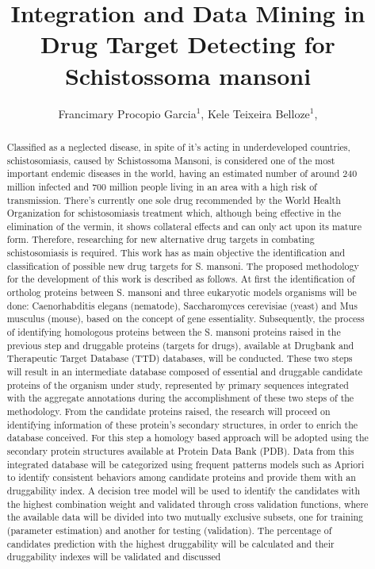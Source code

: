 \documentclass[twoside]{article}
\title{\vspace{-15mm}\fontsize{24pt}{10pt}\selectfont\textbf{ Integration and Data Mining in Drug Target Detecting for Schistossoma mansoni }} %
\author{ Francimary Procopio Garcia$^{1}$, Kele Teixeira Belloze$^{1}$, }
\affil{ 1 CEFET/RJ

 }
\date{}
\begin{document}
  
  
  \maketitle %
  
  
  \thispagestyle{fancy} %
  
  
  \begin{abstract}
  Classified as a neglected disease, in spite of it’s acting in underdeveloped countries, schistosomiasis, caused by Schistossoma Mansoni, is considered one of the most important endemic diseases in the world, having an estimated number of around 240 million infected and 700 million people living in an area with a high risk of transmission. There’s currently one sole drug recommended by the World Health Organization for schistosomiasis treatment which, although being effective in the elimination of the vermin, it shows collateral effects and can only act upon its mature form. Therefore, researching for new alternative drug targets in combating schistosomiasis is required. This work has as main objective the identification and classification of possible new drug targets for S. mansoni. The proposed methodology for the development of this work is described as follows.  At first the identification of ortholog proteins between S. mansoni and three eukaryotic models organisms will be done: Caenorhabditis elegans (nematode), Saccharomyces cerevisiae (yeast) and Mus musculus (mouse), based on the concept of gene essentiality. Subsequently, the process of identifying homologous proteins between the S. mansoni proteins raised in the previous step and druggable proteins (targets for drugs), available at Drugbank and Therapeutic Target Database (TTD) databases, will be conducted. These two steps will result in an intermediate database composed of essential and druggable candidate proteins of the organism under study, represented by primary sequences integrated with the aggregate annotations during the accomplishment of these two steps of the methodology. From the candidate proteins raised, the research will proceed on identifying information of these protein's secondary structures, in order to enrich the database conceived. For this step a homology based approach will be adopted using the secondary protein structures available at Protein Data Bank (PDB). Data from this integrated database will be categorized using frequent patterns models such as Apriori to identify consistent behaviors among candidate proteins and provide them with an druggability index. A decision tree model will be used to identify the candidates with the highest combination weight and validated through cross validation functions, where the available data will be divided into two mutually exclusive subsets, one for training (parameter estimation) and another for testing (validation). The percentage of candidates prediction with the highest druggability will be calculated and their druggability indexes will be validated and discussed 
\end{abstract}
\end{document}
